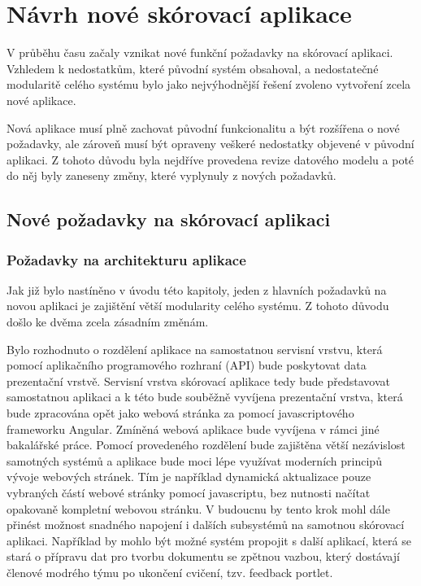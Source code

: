 \documentclass[
  digital, %
  twoside, %
  table,   %
  nolof,     %
  nolot,     %
]{fithesis3}
\begin{document}
\chapter{Návrh nové skórovací aplikace}
V průběhu času začaly vznikat nové funkční požadavky na skórovací aplikaci. Vzhledem k nedostatkům, které původní systém obsahoval, a nedostatečné modularitě celého systému bylo jako nejvýhodnější řešení zvoleno vytvoření zcela nové aplikace. 

Nová aplikace musí plně zachovat původní funkcionalitu a být rozšířena o nové požadavky, ale zároveň musí být opraveny veškeré nedostatky objevené v původní aplikaci. Z tohoto důvodu byla nejdříve provedena revize datového modelu a poté do něj byly zaneseny změny, které vyplynuly z nových požadavků. 

\section{Nové požadavky na skórovací aplikaci}
\subsection{Požadavky na architekturu aplikace}

Jak již bylo nastíněno v úvodu této kapitoly, jeden z hlavních požadavků na novou aplikaci je zajištění větší modularity celého systému. Z tohoto důvodu došlo ke dvěma zcela zásadním změnám.

Bylo rozhodnuto o rozdělení aplikace na samostatnou servisní vrstvu, která pomocí aplikačního programového rozhraní (API) bude poskytovat data prezentační vrstvě. Servisní vrstva skórovací aplikace tedy bude představovat samostatnou aplikaci a k této bude souběžně vyvíjena prezentační vrstva, která bude zpracována opět jako webová stránka za pomocí javascriptového frameworku Angular. Zmíněná webová aplikace bude vyvíjena v rámci jiné bakalářské práce. Pomocí provedeného rozdělení bude zajištěna větší nezávislost samotných systémů a aplikace bude moci lépe využívat moderních principů vývoje webových stránek. Tím je například dynamická aktualizace pouze vybraných částí webové stránky pomocí javascriptu, bez nutnosti načítat opakovaně kompletní webovou stránku. V budoucnu by tento krok mohl dále přinést možnost  snadného napojení i dalších subsystémů na samotnou skórovací aplikaci. Například by mohlo být možné systém propojit s další aplikací, která se stará o přípravu dat pro tvorbu dokumentu se zpětnou vazbou, který dostávají členové modrého týmu po ukončení cvičení, tzv. feedback portlet.
\end{document}
